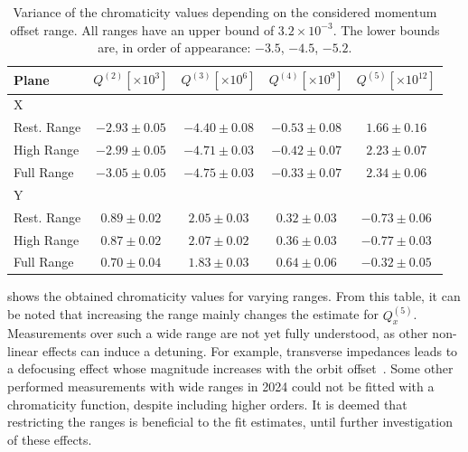 \begin{table}
    \centering
    \begin{tabular}{lcccc}
      \toprule
      Plane & $Q^{(2)} [\times 10^{3}]$ & $Q^{(3)} [\times 10^{6}]$ & $Q^{(4)} [\times 10^{9}]$ & $Q^{(5)} [\times 10^{12}]$ \\
      \midrule
      X &&&& \\  
      \hspace{2mm}Rest. Range &$-2.93 \pm 0.05$ & $-4.40 \pm 0.08$ & $-0.53 \pm 0.08$ & $ 1.66 \pm 0.16$ \\
      \hspace{2mm}High Range  &$-2.99 \pm 0.05$ & $-4.71 \pm 0.03$ & $-0.42 \pm 0.07$ & $ 2.23 \pm 0.07$ \\
      \hspace{2mm}Full Range  &$-3.05 \pm 0.05$ & $-4.75 \pm 0.03$ & $-0.33 \pm 0.07$ & $ 2.34 \pm 0.06$ \\
      Y &&&& \\  
      \hspace{2mm}Rest. Range &$ 0.89 \pm 0.02$ & $ 2.05 \pm 0.03$ & $ 0.32 \pm 0.03$ & $-0.73 \pm 0.06$ \\
      \hspace{2mm}High Range  &$ 0.87 \pm 0.02$ & $ 2.07 \pm 0.02$ & $ 0.36 \pm 0.03$ & $-0.77 \pm 0.03$ \\
      \hspace{2mm}Full Range  &$ 0.70 \pm 0.04$ & $ 1.83 \pm 0.03$ & $ 0.64 \pm 0.06$ & $-0.32 \pm 0.05$ \\
      \bottomrule
    \end{tabular}
    \caption{Variance of the chromaticity values depending on the considered momentum offset range.
    All ranges have an upper bound of $3.2\times10^{-3}$. The lower bounds are, in order of
    appearance: $-3.5$, $-4.5$, $-5.2$.}
    \label{tab:high_orders:further:chroma_different_ranges}
  \end{table}

 shows the obtained chromaticity values for
varying ranges. From this table, it can be noted that increasing the range mainly
changes the estimate for $Q^{(5)}_x$.
Measurements over such a wide range are not yet fully understood, as other non-linear effects can
induce a detuning. For example, transverse impedances leads to a defocusing effect whose magnitude
increases with the orbit offset~\cite{antipov_single-collimator_2018,kurtulus_lhc_2022}.
Some other performed measurements with wide ranges in 2024 could not be fitted with a chromaticity
function, despite including higher orders. It is deemed that restricting the ranges is beneficial to
the fit estimates, until further investigation of these effects.



